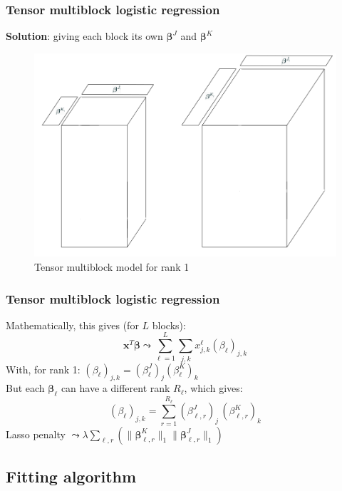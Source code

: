 \documentclass{beamer}
\begin{document}
\begin{frame}
    \frametitle{Tensor multiblock logistic regression}
    \vspace{10 pt}
    \textbf{Solution}: giving each block its own $\bm{\beta}^J$ and $\bm{\beta}^K$\\[15 pt]
    \begin{figure}
        \centering
        \includegraphics[scale = 0.28]{images/beta_blocks.png}
        \caption{Tensor multiblock model for rank 1}
    \end{figure}
\end{frame}

\begin{frame}
    \frametitle{Tensor multiblock logistic regression}
    Mathematically, this gives (for $L$ blocks):
    $$\mathbf{x}^T\bm{\beta} \leadsto   \sum\limits_{\ell = 1}^L \sum\limits_{j,k} x_{j,k}^\ell(\beta_\ell)_{j,k}$$
    With, for rank 1: $(\beta_\ell)_{j,k} = (\beta_\ell^{J})_j(\beta_\ell^{K})_k$\\[10 pt]
    But each $\bm{\beta}_\ell$ can have a different rank $R_\ell$, which gives:
    $$(\beta_\ell)_{j,k} = \sum\limits_{r = 1}^{R_\ell} (\beta_{\ell,r}^J)_j \, (\beta_{\ell,r}^K)_k $$
    Lasso penalty $\leadsto \lambda \sum\limits_{\ell,r} \left( \lVert \bm{\beta}_{\ell,r}^K \rVert_1 \lVert \bm{\beta}_{\ell,r}^J \rVert_1 \right)$
\end{frame}

\begin{frame}
    \section{Fitting algorithm}
\end{frame}
\end{document}
